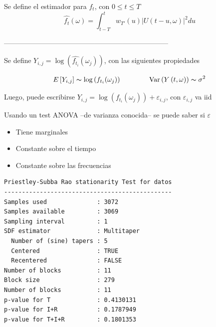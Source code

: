 \begin{tcolorbox}
Se define el estimador para $f_t$, con $0 \leq t \leq T$
\begin{equation*}
\widehat{f_t}(\omega) = \int_{t-T}^{t} w_{T'}(u) \lvert U(t-u,\omega) \lvert^{2} du
\end{equation*}
\end{tcolorbox}



%
%
%
-----------------------------------------------------------------------

Se define $Y_{i,j} = \log \left( \widehat{f_{t_i}}(\omega_j) \right)$, con las siguientes propiedades

\begin{equation*}
E\left[ Y_{i,j} \right] \thicksim \log \left( f_{t_i}(\omega_j) \right)
\hspace{4em}
\text{Var}\left( {Y\left(t,\omega\right)}\right) \thicksim \sigma^{2}
\end{equation*}

Luego, puede escribirse $Y_{i,j} = \log \left( f_{t_i}(\omega_j) \right) + \varepsilon_{i,j}$,
con $\varepsilon_{i,j}$ va iid

Usando un test ANOVA --de varianza conocida-- se puede saber si $\varepsilon$
\vspace{-1em}
\begin{itemize}
\item Tiene marginales
\item Constante sobre el tiempo
\item Constante sobre las frecuencias
\end{itemize}

\begin{lstlisting}
Priestley-Subba Rao stationarity Test for datos
-----------------------------------------------
Samples used              : 3072 
Samples available         : 3069 
Sampling interval         : 1 
SDF estimator             : Multitaper 
  Number of (sine) tapers : 5 
  Centered                : TRUE 
  Recentered              : FALSE 
Number of blocks          : 11 
Block size                : 279 
Number of blocks          : 11 
p-value for T             : 0.4130131 
p-value for I+R           : 0.1787949 
p-value for T+I+R         : 0.1801353 
\end{lstlisting}

